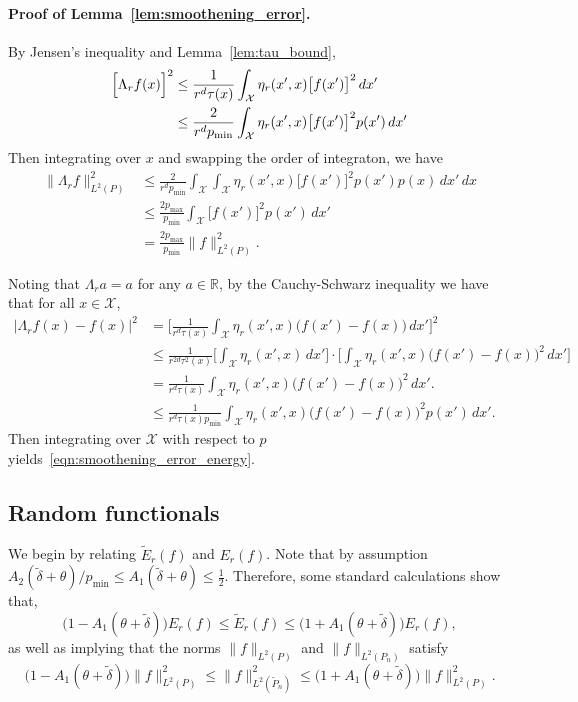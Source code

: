 \documentclass{article}
\newcommand{\Reals}{\mathbb{R}}
\newcommand{\1}{\mathbf{1}}
\newcommand{\Xset}{\mathcal{X}}
\newcommand{\Leb}{L}
\newcommand{\wt}[1]{\widetilde{#1}}
\theoremstyle{alden}
\theoremstyle{aldenthm}
\theoremstyle{definition}
\theoremstyle{remark}
\begin{document}
\paragraph{Proof of Lemma~\ref{lem:smoothening_error}.}
By Jensen's inequality and Lemma~\ref{lem:tau_bound},
\begin{align*}
\Bigl[\Lambda_rf(x)\Bigr]^2 & \leq \frac{1}{r^d \tau(x)}\int_{\Xset} \eta_r(x',x) \bigl[f(x')\bigr]^2 \,dx' \\
& \leq \frac{2}{r^d p_{\min}}\int_{\Xset} \eta_r(x',x) \bigl[f(x')\bigr]^2 p(x') \,dx'
\end{align*}
Then integrating over $x$ and swapping the order of integraton, we have
\begin{align*}
\bigl\|\Lambda_rf\bigr\|_{\Leb^2(P)}^2 & \leq \frac{2}{r^d p_{\min}} \int_{\Xset} \int_{\Xset} \eta_r(x',x) \bigl[f(x')\bigr]^2 p(x') p(x) \,dx' \,dx \\ 
& \leq \frac{2p_{\max}}{p_{\min}} \int_{\Xset} \bigl[f(x')\bigr]^2 p(x') \,dx' \\
& = \frac{2p_{\max}}{p_{\min}} \|f\|_{\Leb^2(P)}^2.
\end{align*}

Noting that $\Lambda_ra = a$ for any $a \in \Reals$, by the Cauchy-Schwarz inequality we have that for all $x \in \Xset$,
\begin{align*}
\bigl|\Lambda_rf(x) - f(x)\bigr|^2 & = \biggl[\frac{1}{r^d\tau(x)} \int_{\Xset} \eta_r(x',x) \bigl(f(x') - f(x)\bigr) \,dx'\biggr]^2 \\
& \leq \frac{1}{r^{2d} \tau^2(x)} \biggl[\int_{\Xset} \eta_r(x',x) \,dx'\biggr] \cdot \biggl[\int_{\Xset} \eta_r(x',x) \bigl(f(x') - f(x)\bigr)^2 \,dx'\biggr] \\
& = \frac{1}{r^d \tau(x)} \int_{\Xset} \eta_r(x',x) \bigl(f(x') - f(x)\bigr)^2 \,dx'. \\
& \leq \frac{1}{r^d \tau(x) p_{\min}} \int_{\Xset} \eta_r(x',x) \bigl(f(x') - f(x)\bigr)^2 p(x') \,dx'.
\end{align*}
Then integrating over $\Xset$ with respect to $p$ yields~\eqref{eqn:smoothening_error_energy}.



\subsection{Random functionals}
\label{subsec:random_functionals}

We begin by relating $\wt{E}_r(f)$ and $E_r(f)$. Note that by assumption $A_2(\wt{\delta} + \theta)/p_{\min} \leq A_1(\wt{\delta} + \theta) \leq \frac{1}{2}$. Therefore, some standard calculations show that,
\begin{equation}
\label{eqn:calder19_1}
\bigl(1 - A_1(\theta + \wt{\delta})\bigr) E_r(f) \leq \wt{E}_r(f) \leq \bigl(1 + A_1(\theta + \wt{\delta})\bigr) E_r(f),
\end{equation}
as well as implying that the norms $\|f\|_{\Leb^2(P)}$ and $\|f\|_{\Leb^2(P_n)}$ satisfy
\begin{equation}
\label{eqn:calder19_2}
\bigl(1 - A_1(\theta + \wt{\delta})\bigr) \|f\|_{\Leb^2(P)}^2 \leq \|f\|_{\Leb^2(\wt{P}_n)}^2 \leq \bigl(1 + A_1(\theta + \wt{\delta})\bigr) \|f\|_{\Leb^2(P)}^2.
\end{equation}
\end{document}
